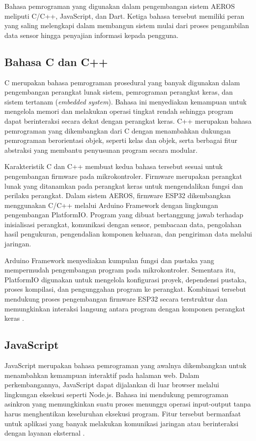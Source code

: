 Bahasa pemrograman yang digunakan dalam pengembangan sistem AEROS meliputi C/C++, JavaScript, dan Dart. Ketiga bahasa tersebut memiliki peran yang saling melengkapi dalam membangun sistem mulai dari proses pengambilan data sensor hingga penyajian informasi kepada pengguna.

\subsection{Bahasa C dan C++}
\label{subsec:Bahasa_C_CPP}

C merupakan bahasa pemrograman prosedural yang banyak digunakan dalam pengembangan perangkat lunak sistem, pemrograman perangkat keras, dan sistem tertanam (\textit{embedded system}). Bahasa ini menyediakan kemampuan untuk mengelola memori dan melakukan operasi tingkat rendah sehingga program dapat berinteraksi secara dekat dengan perangkat keras. C++ merupakan bahasa pemrograman yang dikembangkan dari C dengan menambahkan dukungan pemrograman berorientasi objek, seperti kelas dan objek, serta berbagai fitur abstraksi yang membantu penyusunan program secara modular.

Karakteristik C dan C++ membuat kedua bahasa tersebut sesuai untuk pengembangan firmware pada mikrokontroler. Firmware merupakan perangkat lunak yang ditanamkan pada perangkat keras untuk mengendalikan fungsi dan perilaku perangkat. Dalam sistem AEROS, firmware ESP32 dikembangkan menggunakan C/C++ melalui Arduino Framework dengan lingkungan pengembangan PlatformIO. Program yang dibuat bertanggung jawab terhadap inisialisasi perangkat, komunikasi dengan sensor, pembacaan data, pengolahan hasil pengukuran, pengendalian komponen keluaran, dan pengiriman data melalui jaringan.

Arduino Framework menyediakan kumpulan fungsi dan pustaka yang mempermudah pengembangan program pada mikrokontroler. Sementara itu, PlatformIO digunakan untuk mengelola konfigurasi proyek, dependensi pustaka, proses kompilasi, dan pengunggahan program ke perangkat. Kombinasi tersebut mendukung proses pengembangan firmware ESP32 secara terstruktur dan memungkinkan interaksi langsung antara program dengan komponen perangkat keras \cite{platformio_arduino}.

\subsection{JavaScript}
\label{subsec:Bahasa_JavaScript}

JavaScript merupakan bahasa pemrograman yang awalnya dikembangkan untuk menambahkan kemampuan interaktif pada halaman web. Dalam perkembangannya, JavaScript dapat dijalankan di luar browser melalui lingkungan eksekusi seperti Node.js. Bahasa ini mendukung pemrograman asinkron yang memungkinkan suatu proses menunggu operasi input-output tanpa harus menghentikan keseluruhan eksekusi program. Fitur tersebut bermanfaat untuk aplikasi yang banyak melakukan komunikasi jaringan atau berinteraksi dengan layanan eksternal \cite{nodejs_intro}.

